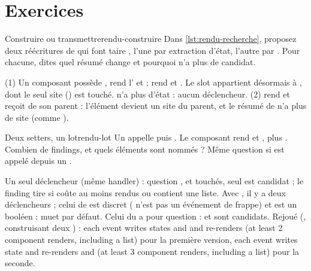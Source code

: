 \section{Exercices}
\label{sec:regles-rendu-rsc-exercices}

\begin{exercice}{Construire ou transmettre}{rendu-construire}
Dans \cref{lst:rendu-recherche}, proposez deux réécritures de  qui font taire
, l'une par extraction d'état, l'autre par . Pour
chacune, dites quel résumé  change et pourquoi  n'a plus
de candidat.
\end{exercice}
\begin{solution}
(1) Un composant  possède , rend l' et
 ;  rend  et . Le slot
appartient désormais à , dont le seul site () est touché.
 n'a plus d'état : aucun déclencheur. (2)  rend
 et reçoit  de son parent : l'élément devient un site du
parent, et le résumé de  n'a plus de site  (comme
).
\end{solution}

\begin{exercice}{Deux setters, un lot}{rendu-lot}
Un  appelle  puis . Le composant rend
 et , plus . Combien de findings, et quels
éléments sont nommés ? Même question si  est appelé depuis un .
\end{exercice}
\begin{solution}
Un seul déclencheur (même handler) : question ,  et 
touchés, seul  est candidat ; le finding tire si  coûte au moins
 rendus ou contient une liste. Avec , il y a deux
déclencheurs ; celui de  est discret ( n'est pas un événement de frappe)
et  est un booléen : muet par défaut. Celui du  a pour question
 :  et  sont candidats. Rejoué (,
 construisant deux ) : \og each  event writes states 
and  and re-renders  (at least 2 component renders, including a list)\fg{}
pour la première version, \og each  event writes state  and re-renders
 and  (at least 3 component renders, including a list)\fg{} pour la seconde.
\end{solution}

